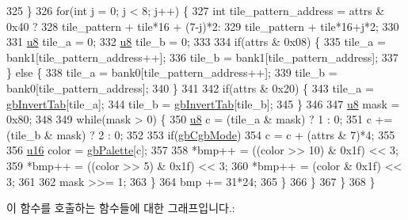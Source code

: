 \begin{DoxyCode}
325       \}
326       \textcolor{keywordflow}{for}(\textcolor{keywordtype}{int} j = 0; j < 8; j++) \{
327         \textcolor{keywordtype}{int} tile\_pattern\_address = attrs & 0x40 ?
328           tile\_pattern + tile*16 + (7-j)*2:
329           tile\_pattern + tile*16+j*2;
330         
331         \mbox{\hyperlink{_system_8h_aed742c436da53c1080638ce6ef7d13de}{u8}} tile\_a = 0;
332         \mbox{\hyperlink{_system_8h_aed742c436da53c1080638ce6ef7d13de}{u8}} tile\_b = 0;
333         
334         \textcolor{keywordflow}{if}(attrs & 0x08) \{
335           tile\_a = bank1[tile\_pattern\_address++];
336           tile\_b = bank1[tile\_pattern\_address];
337         \} \textcolor{keywordflow}{else} \{
338           tile\_a = bank0[tile\_pattern\_address++];
339           tile\_b = bank0[tile\_pattern\_address];
340         \}
341         
342         \textcolor{keywordflow}{if}(attrs & 0x20) \{
343           tile\_a = \mbox{\hyperlink{_g_b_map_view_8cpp_a97f094c733e10c52d264471592f505de}{gbInvertTab}}[tile\_a];
344           tile\_b = \mbox{\hyperlink{_g_b_map_view_8cpp_a97f094c733e10c52d264471592f505de}{gbInvertTab}}[tile\_b];
345         \}
346         
347         \mbox{\hyperlink{_system_8h_aed742c436da53c1080638ce6ef7d13de}{u8}} mask = 0x80;
348         
349         \textcolor{keywordflow}{while}(mask > 0) \{
350           \mbox{\hyperlink{_system_8h_aed742c436da53c1080638ce6ef7d13de}{u8}} c = (tile\_a & mask) ? 1 : 0;
351           c += (tile\_b & mask) ? 2 : 0;
352           
353           \textcolor{keywordflow}{if}(\mbox{\hyperlink{gb_globals_8cpp_aa3e3449c9ba4db2eeb687d6facfca761}{gbCgbMode}})
354             c = c + (attrs & 7)*4;
355           
356           \mbox{\hyperlink{_system_8h_a9e6c91d77e24643b888dbd1a1a590054}{u16}} color = \mbox{\hyperlink{gb_globals_8cpp_a7c46bfb4d71e64d27d5aec543ba85b9a}{gbPalette}}[c];
357           
358           *bmp++ = ((color >> 10) & 0x1f) << 3;
359           *bmp++ = ((color >> 5) & 0x1f) << 3;
360           *bmp++ = (color & 0x1f) << 3;
361           
362           mask >>= 1;
363         \}
364         bmp += 31*24;
365       \}
366     \}
367   \}
368 \}
\end{DoxyCode}
이 함수를 호출하는 함수들에 대한 그래프입니다.\+:
\nopagebreak
